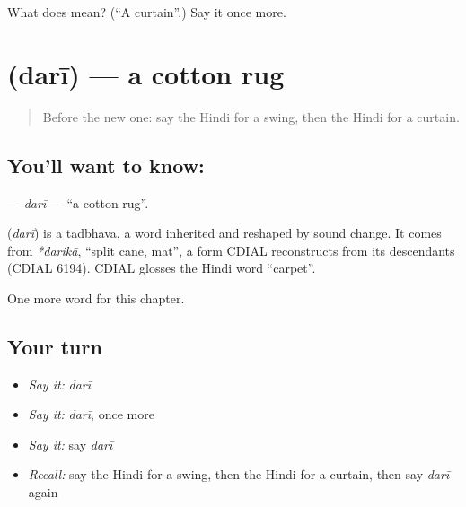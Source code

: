 \begin{tcolorbox}[breakable,colback=teal!4,colframe=teal!35!black,title={Before you move on}]
What does  mean? (\textquotedblleft{}A curtain\textquotedblright{}.) Say it once more.
\end{tcolorbox}
\section[\texorpdfstring{\hi{दरी} (darī)}{दरी (darī)}]{ (darī) — a cotton rug}

\label{lesson:HI-C265-dari}



\begin{quote}
Before the new one: say the Hindi for a swing, then the Hindi for a curtain.
\end{quote}

\subsection*{You'll want to know: }
\textbf{} — \emph{darī} — \textquotedblleft{}a cotton rug\textquotedblright{}.

\begin{cousinweb}
\textbf{} (\emph{darī}) is a tadbhava, a word inherited and reshaped by sound change. It comes from \emph{*darikā}, \textquotedblleft{}split cane, mat\textquotedblright{}, a form CDIAL reconstructs from its descendants (CDIAL 6194). CDIAL glosses the Hindi word \textquotedblleft{}carpet\textquotedblright{}.
\end{cousinweb}

\begin{grammarlens}[title={What you've built}]
One more word for this chapter.
\end{grammarlens}

\subsection*{Your turn}
\begin{itemize}
\raggedright
  \item \emph{Say it:} \emph{darī}
  \item \emph{Say it:} \emph{darī}, once more
  \item \emph{Say it:} say \emph{darī}
  \item \emph{Recall:} say the Hindi for a swing, then the Hindi for a curtain, then say \emph{darī} again
\end{itemize}

